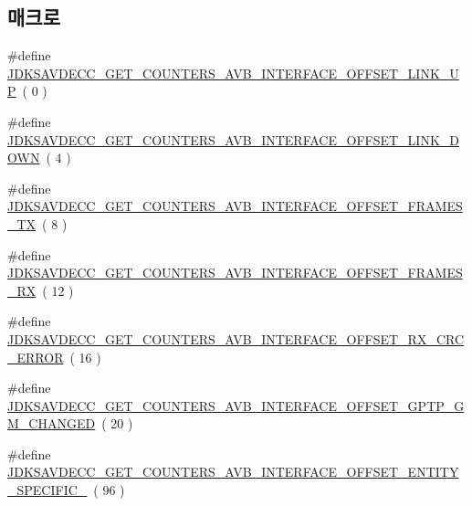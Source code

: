 \subsection*{매크로}
\begin{DoxyCompactItemize}
\item 
\#define \hyperlink{group__get__counters__avb__interface_ga0b604e5ec122bff4b1356b6a650b5a0b}{J\+D\+K\+S\+A\+V\+D\+E\+C\+C\+\_\+\+G\+E\+T\+\_\+\+C\+O\+U\+N\+T\+E\+R\+S\+\_\+\+A\+V\+B\+\_\+\+I\+N\+T\+E\+R\+F\+A\+C\+E\+\_\+\+O\+F\+F\+S\+E\+T\+\_\+\+L\+I\+N\+K\+\_\+\+UP}~( 0 )
\item 
\#define \hyperlink{group__get__counters__avb__interface_gaa4cbfa4acc1720be285e1db2e94475fb}{J\+D\+K\+S\+A\+V\+D\+E\+C\+C\+\_\+\+G\+E\+T\+\_\+\+C\+O\+U\+N\+T\+E\+R\+S\+\_\+\+A\+V\+B\+\_\+\+I\+N\+T\+E\+R\+F\+A\+C\+E\+\_\+\+O\+F\+F\+S\+E\+T\+\_\+\+L\+I\+N\+K\+\_\+\+D\+O\+WN}~( 4 )
\item 
\#define \hyperlink{group__get__counters__avb__interface_gad1b1bdba89991df7ede6d087a4bdba16}{J\+D\+K\+S\+A\+V\+D\+E\+C\+C\+\_\+\+G\+E\+T\+\_\+\+C\+O\+U\+N\+T\+E\+R\+S\+\_\+\+A\+V\+B\+\_\+\+I\+N\+T\+E\+R\+F\+A\+C\+E\+\_\+\+O\+F\+F\+S\+E\+T\+\_\+\+F\+R\+A\+M\+E\+S\+\_\+\+TX}~( 8 )
\item 
\#define \hyperlink{group__get__counters__avb__interface_ga430ebe936ae8fc3eabe812c668720673}{J\+D\+K\+S\+A\+V\+D\+E\+C\+C\+\_\+\+G\+E\+T\+\_\+\+C\+O\+U\+N\+T\+E\+R\+S\+\_\+\+A\+V\+B\+\_\+\+I\+N\+T\+E\+R\+F\+A\+C\+E\+\_\+\+O\+F\+F\+S\+E\+T\+\_\+\+F\+R\+A\+M\+E\+S\+\_\+\+RX}~( 12 )
\item 
\#define \hyperlink{group__get__counters__avb__interface_gaed538c9e6776b10eebd79f97f244e99b}{J\+D\+K\+S\+A\+V\+D\+E\+C\+C\+\_\+\+G\+E\+T\+\_\+\+C\+O\+U\+N\+T\+E\+R\+S\+\_\+\+A\+V\+B\+\_\+\+I\+N\+T\+E\+R\+F\+A\+C\+E\+\_\+\+O\+F\+F\+S\+E\+T\+\_\+\+R\+X\+\_\+\+C\+R\+C\+\_\+\+E\+R\+R\+OR}~( 16 )
\item 
\#define \hyperlink{group__get__counters__avb__interface_gaa0bc1e82f811146d3f2f5aa182abd605}{J\+D\+K\+S\+A\+V\+D\+E\+C\+C\+\_\+\+G\+E\+T\+\_\+\+C\+O\+U\+N\+T\+E\+R\+S\+\_\+\+A\+V\+B\+\_\+\+I\+N\+T\+E\+R\+F\+A\+C\+E\+\_\+\+O\+F\+F\+S\+E\+T\+\_\+\+G\+P\+T\+P\+\_\+\+G\+M\+\_\+\+C\+H\+A\+N\+G\+ED}~( 20 )
\item 
\#define \hyperlink{group__get__counters__avb__interface_ga94a7818fe7cc2f6e53fe070ce9d4e485}{J\+D\+K\+S\+A\+V\+D\+E\+C\+C\+\_\+\+G\+E\+T\+\_\+\+C\+O\+U\+N\+T\+E\+R\+S\+\_\+\+A\+V\+B\+\_\+\+I\+N\+T\+E\+R\+F\+A\+C\+E\+\_\+\+O\+F\+F\+S\+E\+T\+\_\+\+E\+N\+T\+I\+T\+Y\+\_\+\+S\+P\+E\+C\+I\+F\+I\+C\+\_}~( 96 )
\item 

\end{DoxyCompactItemize}
